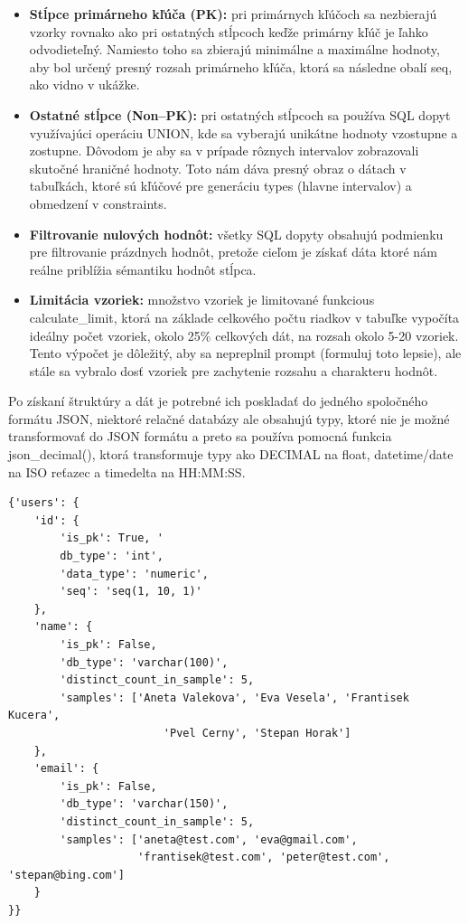 \begin{itemize}
    \item \textbf{Stĺpce primárneho kľúča (PK):} pri primárnych kľúčoch sa nezbierajú vzorky rovnako ako pri ostatných stĺpcoch keďže primárny kľúč je ľahko odvodieteľný. Namiesto toho sa zbierajú minimálne a maximálne hodnoty, aby bol určený presný rozsah primárneho kľúča, ktorá sa následne obalí seq, ako vidno v ukážke. 
    \item \textbf{Ostatné stĺpce (Non–PK):} pri ostatných stĺpcoch sa používa SQL dopyt využívajúci operáciu UNION, kde sa vyberajú unikátne hodnoty vzostupne a zostupne. Dôvodom je aby sa v prípade rôznych intervalov zobrazovali skutočné hraničné hodnoty. Toto nám dáva presný obraz o dátach v tabuľkách, ktoré sú kľúčové pre generáciu types (hlavne intervalov) a obmedzení v constraints.
    \item \textbf{Filtrovanie nulových hodnôt:} všetky SQL dopyty obsahujú podmienku pre filtrovanie prázdnych hodnôt, pretože cieľom je získať dáta ktoré nám reálne priblížia sémantiku hodnôt stĺpca.
    \item \textbf{Limitácia vzoriek:} množstvo vzoriek je limitované funkcious calculate\_limit, ktorá na základe celkového počtu riadkov v tabuľke vypočíta ideálny počet vzoriek, okolo 25\% celkových dát, na rozsah okolo 5-20 vzoriek. Tento výpočet je dôležitý, aby sa nepreplnil prompt (formuluj toto lepsie), ale stále sa vybralo dosť vzoriek pre zachytenie rozsahu a charakteru hodnôt.
\end{itemize}


Po získaní štruktúry a dát je potrebné ich poskladať do jedného spoločného formátu JSON, niektoré relačné databázy ale obsahujú typy, ktoré nie je možné transformovať do JSON formátu a preto sa používa pomocná funkcia json\_decimal(), ktorá transformuje typy ako DECIMAL na float, datetime/date na ISO reťazec a timedelta na HH:MM:SS.


\begin{lstlisting}[caption={Príklad serializovaného vstupu}, label={lst:json}, linewidth=\textwidth]
{'users': {
    'id': {
        'is_pk': True, '
        db_type': 'int', 
        'data_type': 'numeric', 
        'seq': 'seq(1, 10, 1)'
    }, 
    'name': {
        'is_pk': False, 
        'db_type': 'varchar(100)', 
        'distinct_count_in_sample': 5, 
        'samples': ['Aneta Valekova', 'Eva Vesela', 'Frantisek Kucera', 
                        'Pvel Cerny', 'Stepan Horak']
    }, 
    'email': {
        'is_pk': False, 
        'db_type': 'varchar(150)', 
        'distinct_count_in_sample': 5, 
        'samples': ['aneta@test.com', 'eva@gmail.com', 
                    'frantisek@test.com', 'peter@test.com', 'stepan@bing.com']
    }
}}

\end{lstlisting}

